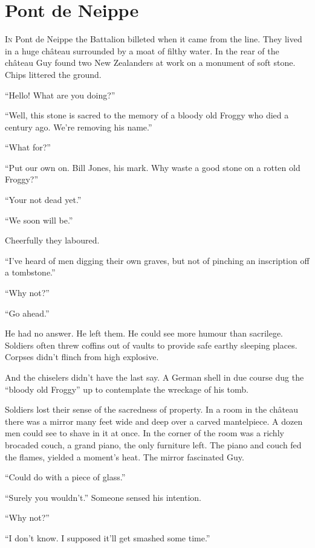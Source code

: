 \chapter*{\textsf{Pont de Neippe}}

I\textsc{n} Pont de Neippe the Battalion billeted when it came from the line. They lived in a huge ch\^{a}teau surrounded by a moat of filthy water. In the rear of the ch\^{a}teau Guy found two New Zealanders at work on a monument of soft stone. Chips littered the ground.

``Hello! What are you doing?''

``Well, this stone is sacred to the memory of a bloody old Froggy who died a century ago. We're removing his name.''

``What for?''

``Put our own on. Bill Jones, his mark. Why waste a good stone on a rotten old Froggy?''

``Your not dead yet.''

``We soon will be.''

Cheerfully they laboured.

``I've heard of men digging their own graves, but not of pinching an inscription off a tombstone.''

``Why not?''

``Go ahead.''

He had no answer. He left them. He could see more humour than sacrilege. Soldiers often threw coffins out of vaults to provide safe earthy sleeping places. Corpses didn't flinch from high explosive.

And the chiselers didn't have the last say. A German shell in due course dug the ``bloody old Froggy'' up to contemplate the wreckage of his tomb.

Soldiers lost their sense of the sacredness of property. In a room in the ch\^{a}teau there was a mirror many feet wide and deep over a carved mantelpiece. A dozen men could see to shave in it at once. In the corner of the room was a richly brocaded couch, a grand piano, the only furniture left. The piano and couch fed the flames, yielded a moment's heat. The mirror fascinated Guy.

``Could do with a piece of glass.''

``Surely you wouldn't.'' Someone sensed his intention.

``Why not?''

``I don't know. I supposed it'll get smashed some time.''


